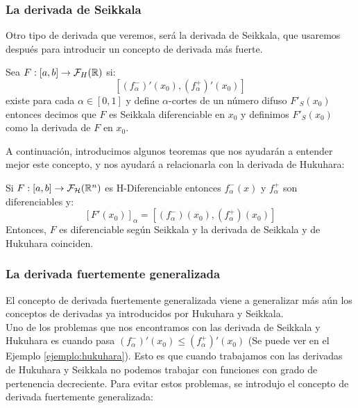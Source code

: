 \subsubsection{La derivada de Seikkala}
Otro tipo de derivada que veremos, será la derivada de Seikkala, que usaremos después para introducir un concepto de derivada más fuerte.

\begin{definicion}
	Sea $F: [a, b] \rightarrow \mathcal{F}_H(\mathbb R)$ si:
	\[
		[(f^-_\alpha)'(x_0), (f^+_\alpha)'(x_0)]
	\]
	existe para cada $\alpha \in [0, 1]$ y define $\alpha$-cortes de un número difuso $F'_S(x_0)$ entonces decimos que $F$ es Seikkala diferenciable en $x_0$ y definimos $F'_S(x_0)$ como la derivada de $F$ en $x_0$.
\end{definicion}

A continuación, introducimos algunos teoremas que nos ayudarán a entender mejor este concepto, y nos ayudará a relacionarla con la derivada de Hukuhara:

\begin{teorema}
	Si $F: [a, b] \rightarrow \mathcal{F}_\mathcal{H}(\mathbb R^n)$ es H-Diferenciable entonces $f_\alpha^-(x)$ y $f_\alpha^+$ son diferenciables y:
	\[
		[F'(x_0)]_\alpha = [(f_\alpha^-)(x_0), (f_\alpha^+)(x_0)]
	\]
	Entonces, $F$ es diferenciable según Seikkala y la derivada de Seikkala y de Hukuhara coinciden.
\end{teorema}

\subsubsection{La derivada fuertemente generalizada}
El concepto de derivada fuertemente generalizada viene a generalizar más aún los conceptos de derivadas ya introducidos por Hukuhara y Seikkala. \\
Uno de los problemas que nos encontramos con las derivada de Seikkala y Hukuhara es cuando pasa $(f^-_\alpha)'(x_0) \leq (f^+_\alpha)'(x_0)$ (Se puede ver en el Ejemplo \ref{ejemplo:hukuhara}). Esto es que cuando trabajamos con las derivadas de Hukuhara y Seikkala no podemos trabajar con funciones con grado de pertenencia decreciente. Para evitar estos problemas, se introdujo el concepto de derivada fuertemente generalizada:

